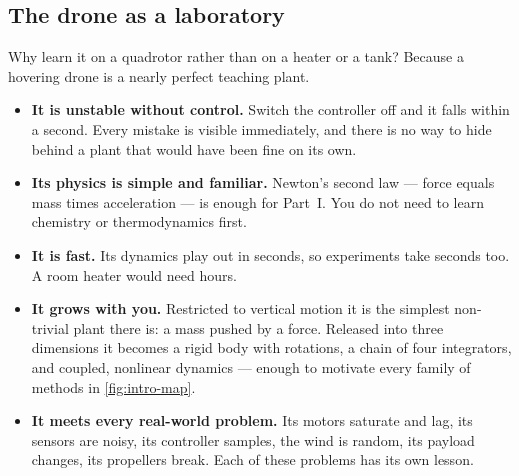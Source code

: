\subsection{The drone as a laboratory}
Why learn it on a quadrotor rather than on a heater or a tank? Because a hovering drone is a nearly perfect teaching plant.
\begin{itemize}
  \item \textbf{It is unstable without control.} Switch the controller off and it falls within a second. Every mistake is visible immediately, and there is no way to hide behind a plant that would have been fine on its own.
  \item \textbf{Its physics is simple and familiar.} Newton's second law — force equals mass times acceleration — is enough for Part~I. You do not need to learn chemistry or thermodynamics first.
  \item \textbf{It is fast.} Its dynamics play out in seconds, so experiments take seconds too. A room heater would need hours.
  \item \textbf{It grows with you.} Restricted to vertical motion it is the simplest non-trivial plant there is: a mass pushed by a force. Released into three dimensions it becomes a rigid body with rotations, a chain of four integrators, and coupled, nonlinear dynamics — enough to motivate every family of methods in \cref{fig:intro-map}.
  \item \textbf{It meets every real-world problem.} Its motors saturate and lag, its sensors are noisy, its controller samples, the wind is random, its payload changes, its propellers break. Each of these problems has its own lesson.
\end{itemize}

